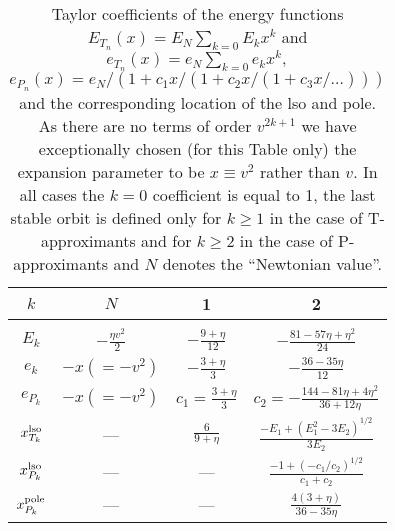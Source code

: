 \begin {table}[h]
\caption {Taylor coefficients of the energy functions
$E_{T_n}(x) = E_N \sum_{k=0} E_k x^k$ and $e_{T_n}(x) = e_N \sum_{k=0} e_k x^k,$ 
$e_{P_n}(x) = e_N/(1+c_1x/(1 + c_2x / (1 + c_3x/ \ldots )))$ and the corresponding
 location of the lso and pole.
As there are no terms of order $v^{2k+1}$ we have exceptionally chosen 
(for this Table only) the expansion 
parameter to be $x\equiv v^2$ rather than $v.$ In all cases the
 $k=0$ coefficient
is equal to 1, the last stable orbit is defined only for $k\ge 1$ in the
case of T-approximants and for $k\ge 2$ in the case of P-approximants
and $N$ denotes the ``Newtonian value''.}
\begin {center}
\begin {tabular}{c c c c}
\hline
$k$    & $N$ & 1  & 2 \\[3pt]
\hline\\[-8pt]
$E_k$ 
     & $-\frac{\eta v^2}{2}$
     & $-\frac{9+\eta}{12}$
     & $-\frac{81-57\eta+\eta^2}{24}$\\[3pt]
$e_k$  
      & $-x(=-v^2)$
      & $-\frac{3+\eta}{3}$
      & $-\frac{36-35\eta}{12}$\\[3pt]
$e_{P_k}$  
      & $-x(=-v^2)$
      & $c_1=\frac{3+\eta}{3}$
      & $c_2=-\frac{144-81\eta+4 \eta^2}{36+12\eta}$\\[3pt]
$x^{\rm lso}_{T_k}$
      & ---
      & $\frac{6}{9+\eta}$
      & $\frac {-E_1 + (E_1^2-3E_2)^{1/2}}{3E_2} $\\[3pt]
$x^{\rm lso}_{P_k}$
      & ---
      & ---
      & $\frac{-1 + (-c_1/c_2)^{1/2}}{c_1+c_2}$ \\[3pt]
$x^{\rm pole}_{P_k}$
      & ---
      & ---
      & $\frac{4(3+\eta)}{36-35\eta}$\\[3pt]
\hline
\end {tabular}
\end {center}
\label{table:energy}
\end {table}

